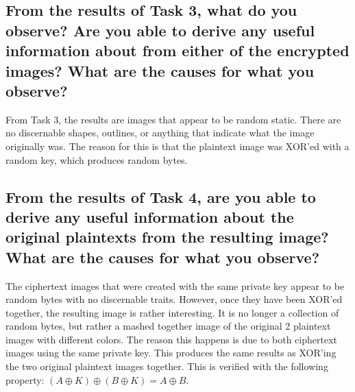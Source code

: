 \documentclass[11pt]{article}
\begin{document}
  \subsection{From the results of Task 3, what do you observe? Are you able to derive any 
  useful information about from either of the encrypted images? What are the 
  causes for what you observe?}
  From Task 3, the results are images that appear to be random static.
  There are no discernable shapes, outlines, or anything that indicate what the 
  image originally was. The reason for this is that the plaintext image was
  XOR'ed with a random key, which produces random bytes.


  \subsection{From the results of Task 4, are you able to derive any useful information 
  about the original plaintexts from the resulting image? What are the causes 
  for what you observe?}
  The ciphertext images that were created with the same private key appear to 
  be random bytes with no discernable traits. 
  However, once they have been XOR'ed together, the resulting image is rather
  interesting. It is no longer a collection of random bytes, but rather a 
  mashed together image of the original 2 plaintext images with different colors. 
  The reason this happens is due to both ciphertext images using the same
  private key. This produces the same results as XOR'ing the two original 
  plaintext images together. This is verified with the following property: 
  $(A \oplus K) \oplus (B \oplus K) = A \oplus B$. 
\end{document}
